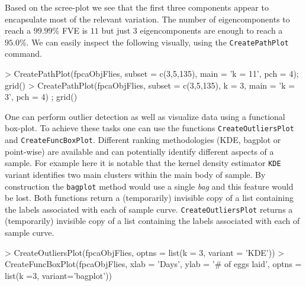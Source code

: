 \documentclass[11pt,english]{article}
\begin{document}
\begin{Schunk}
\end{Schunk}
 

Based on the scree-plot we see that the first three components appear to encapsulate most of the relevant variation. The number of eigencomponents to reach a $99.99\%$ FVE is $11$ but just $3$ eigencomponents are enough to reach a $95.0\%$. We can easily inspect the following visually, using the \texttt{CreatePathPlot} command.
\begin{Schunk}
\begin{Sinput}
>   CreatePathPlot(fpcaObjFlies, subset = c(3,5,135), main = 'k = 11', pch = 4); grid()
>   CreatePathPlot(fpcaObjFlies, subset = c(3,5,135), k = 3, main = 'k = 3', pch = 4) ; grid()  
\end{Sinput}
\end{Schunk}


One can perform outlier detection \cite{Febrero2007} as well as visualize data using a functional box-plot. To achieve these tasks one can use the functions \texttt{CreateOutliersPlot} and \texttt{CreateFuncBoxPlot}. Different ranking methodologies (KDE, bagplot \cite{Rousseeuw1999,Hyndman2010} or point-wise) are available and can potentially identify different aspects of a sample. For example here it is notable that the  kernel density estimator \texttt{KDE} variant identifies two main clusters within the main body of sample. By construction the \texttt{bagplot} method would use a single \textit{bag} and this feature would be lost. Both functions return a (temporarily) invisible copy of a list containing the labels associated with each of sample curve. \texttt{CreateOutliersPlot} returns a (temporarily) invisible copy of a list containing the labels associated with each of sample curve.
\begin{Schunk}
\begin{Sinput}
>   CreateOutliersPlot(fpcaObjFlies, optns = list(k = 3, variant = 'KDE'))
>   CreateFuncBoxPlot(fpcaObjFlies, xlab = 'Days', ylab = '# of eggs laid', optns = list(k =3, variant='bagplot'))
\end{Sinput}
\end{Schunk}
\end{document}
